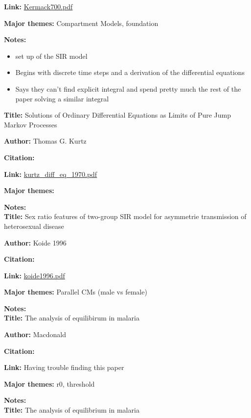 \message{ !name(refs.tex)}\documentclass{article}
\begin{document}
\textbf{Link:} \url{Kermack700.pdf}

\textbf{Major themes:} Compartment Models, foundation

\textbf{Notes:}
\begin{itemize}
\item set up of the SIR model
\item Begins with discrete time steps and a derivation of the differential equations
\item Says they can't find explicit integral and spend pretty much the rest of the paper solving a similar integral
\end{itemize}

\textbf{Title:} Solutions of Ordinary Differential Equations as Limits of Pure Jump Markov Processes

\textbf{Author:}  Thomas G. Kurtz

\textbf{Citation:} \cite{kurtz_diff_eq_1970}

\textbf{Link:} \url{kurtz_diff_eq_1970.pdf}

\textbf{Major themes:}  

\textbf{Notes:}
\\

\textbf{Title:} Sex ratio features of two-group SIR model for asymmetrie transmission of heterosexual disease

\textbf{Author:}  Koide 1996

\textbf{Citation:} \cite{koide1996}

\textbf{Link:} \url{koide1996.pdf}

\textbf{Major themes:}  Parallel CMs (male vs female)

\textbf{Notes:}
\\

\textbf{Title:} The analysis of equilibirum in malaria

\textbf{Author:}  Macdonald

\textbf{Citation:} \cite{macdonald1952analysis}

\textbf{Link:} Having trouble finding this paper

\textbf{Major themes:}  r0, threshold

\textbf{Notes:}
\\

\textbf{Title:} The analysis of equilibrium in malaria
\end{document}
